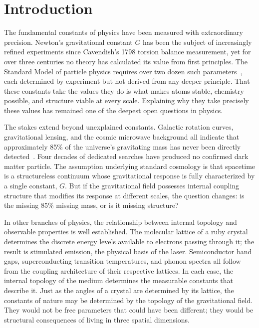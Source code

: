 \documentclass[aps,prd,preprint,superscriptaddress,showpacs,preprintnumbers,amsmath,amssymb,nofootinbib]{revtex4-2}
\begin{document}


\maketitle

\section{Introduction}
\label{sec:intro}

The fundamental constants of physics have been measured with extraordinary precision. Newton's gravitational constant $G$ has been the subject of increasingly refined experiments since Cavendish's 1798 torsion balance measurement, yet for over three centuries no theory has calculated its value from first principles. The Standard Model of particle physics requires over two dozen such parameters~\cite{pdg2024}, each determined by experiment but not derived from any deeper principle. That these constants take the values they do is what makes atoms stable, chemistry possible, and structure viable at every scale. Explaining why they take precisely these values has remained one of the deepest open questions in physics.

The stakes extend beyond unexplained constants. Galactic rotation curves, gravitational lensing, and the cosmic microwave background all indicate that approximately 85\% of the universe's gravitating mass has never been directly detected~\cite{pdg2024}. Four decades of dedicated searches have produced no confirmed dark matter particle. The assumption underlying standard cosmology is that spacetime is a structureless continuum whose gravitational response is fully characterized by a single constant, $G$. But if the gravitational field possesses internal coupling structure that modifies its response at different scales, the question changes: is the missing 85\% missing mass, or is it missing structure?

In other branches of physics, the relationship between internal topology and observable properties is well established. The molecular lattice of a ruby crystal determines the discrete energy levels available to electrons passing through it; the result is stimulated emission, the physical basis of the laser. Semiconductor band gaps, superconducting transition temperatures, and phonon spectra all follow from the coupling architecture of their respective lattices. In each case, the internal topology of the medium determines the measurable constants that describe it. Just as the angles of a crystal are determined by its lattice, the constants of nature may be determined by the topology of the gravitational field. They would not be free parameters that could have been different; they would be structural consequences of living in three spatial dimensions.
\end{document}
